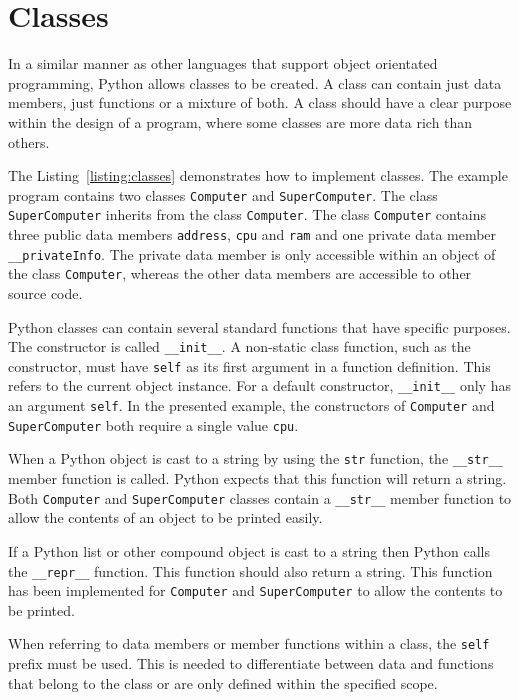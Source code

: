 \documentclass[11pt,a4paper]{article}
\begin{document}
\section{Classes}

In a similar manner as other languages that support object orientated programming, Python allows classes to be created.  A class can contain just data members, just functions or a mixture of both.  A class should have a clear purpose within the design of a program, where some classes are more data rich than others.

The Listing~\ref{listing:classes} demonstrates how to implement classes.  The example program contains two classes \texttt{Computer} and \texttt{SuperComputer}.  The class \texttt{SuperComputer} inherits from the class \texttt{Computer}.  The class \texttt{Computer} contains three public data members \texttt{address}, \texttt{cpu} and \texttt{ram} and one private data member \texttt{\_\_privateInfo}.  The private data member is only accessible within an object of the class \texttt{Computer}, whereas the other data members are accessible to other source code.

Python classes can contain several standard functions that have specific purposes.  The constructor is called \texttt{\_\_init\_\_}.  A non-static class function, such as the constructor, must have \texttt{self} as its first argument in a function definition.  This refers to the current object instance.  For a default constructor, \texttt{\_\_init\_\_} only has an argument \texttt{self}.  In the presented example, the constructors of \texttt{Computer} and \texttt{SuperComputer} both require a single value \texttt{cpu}.

When a Python object is cast to a string by using the \texttt{str} function, the \texttt{\_\_str\_\_} member function is called.  Python expects that this function will return a string.  Both \texttt{Computer} and \texttt{SuperComputer} classes contain a \texttt{\_\_str\_\_} member function to allow the contents of an object to be printed easily.

If a Python list or other compound object is cast to a string then Python calls the \texttt{\_\_repr\_\_} function.  This function should also return a string.  This function has been implemented for \texttt{Computer} and \texttt{SuperComputer} to allow the contents to be printed.

When referring to data members or member functions within a class, the \texttt{self} prefix must be used.  This is needed to differentiate between data and functions that belong to the class or are only defined within the specified scope.
\end{document}

